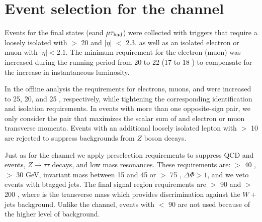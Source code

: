 \section{\texorpdfstring{Event selection for the \leptonTau channel}{Event selection for the lepton-tau channel}}
\label{sect:eleTauCuts}
Events for the \leptonTau final states (e\Tau and $\mu\tau_{\rm had}$)
were collected with triggers that require 
a loosely isolated \Tau with \PT $>$ 20 \GeV and $|\eta|$ $<$ 2.3. as well as
an isolated electron or muon with $|\eta| < 2.1$.  The minimum
\PT requirement for the electron (muon) was increased during the running
period from 20 to 22 \GeV (17 to 18 \GeV)
to compensate for the increase in instantaneous luminosity.

In the offline analysis the \PT requirements for electrons, muons, and \Tau were increased to 25, 20, and 25 \GeV, respectively, while tightening the corresponding identification and isolation requirements.
In events with more than one opposite-sign \leptonTau pair, we only consider
 the pair that maximizes the scalar sum of \Tau and electron or muon 
transverse momenta.  Events with an additional loosely isolated lepton
with \PT $>$ 10 \GeV are rejected to suppress backgrounds from $Z$ boson
decays.  

Just as for the \Tau\Tau channel we apply preselection requirements to suppress
QCD and \ttbar events, $Z \to \tau \tau$ decays, and low mass resonances.
These requirements are: \mttwo $>$ 40 \GeV, \MET $>$ 30 GeV, \leptonTau 
invariant mass between 15 and 45 \GeV or $>$ 75 \GeV, $\Delta \Phi > 1$, and we veto events with btagged jets.
The final signal region requirements are \mttwo $>$ 90 \GeV and 
\tauMT $>$ 200 \GeV, where \tauMT is the \Tau transverse mass which provides
discrimination against the $W+$jets background.  Unlike the \tauTau channel,
events with \mttwo $<$ 90 \GeV are not used because of the higher 
level of background.




